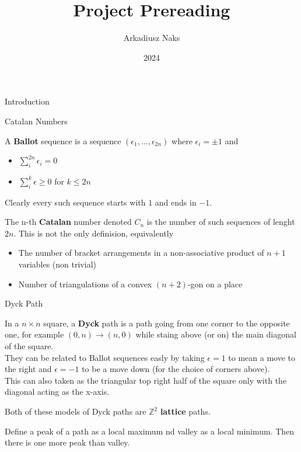 \documentclass[12pt, letterpaper]{article}
\title{Project Prereading}
\author{Arkadiusz Naks}
\date{2024}
\newcommand{\Z}{\mathbb{Z}}
\begin{document}
\tableofcontents
\newpage

\begin{section}{Introduction}

  \begin{subsection}{Catalan Numbers}

    A \textbf{Ballot} sequence is a sequence \((\epsilon_{1}, \dots,
    \epsilon_{2n})\) where \(\epsilon_{i} = \pm 1\) and
    \begin{itemize}
      \item \(\sum^{2n}_{i} \epsilon_{i} = 0\)
      \item \(\sum^{k}_{i} \epsilon \geq 0\) for \(k \leq 2n\)
    \end{itemize}
    Clearly every such sequence starts with \(1\) and ends in \(-1\).

    The n-th \textbf{Catalan} number denoted \(C_{n}\) is the number of such
    sequences of lenght \(2n\). This is not the only definision, equivalently
    \begin{itemize}
      \item The number of bracket arrangements in a non-associative product of
            \(n + 1\) variables (non trivial)
      \item Number of triangulations of a convex \((n + 2)\)-gon on a place
    \end{itemize}

    \begin{subsubsection}{Dyck Path}

      In a \(n \times n\) square, a \textbf{Dyck} path is a path going from one
      corner to the opposite one, for example \((0, n) \to (n, 0)\) while staing
      above (or on) the main diagonal of the square. \\
      They can be related to Ballot sequences easly by taking \(\epsilon = 1\)
      to mean a move to the right and \(\epsilon = -1\) to be a move down (for
      the choice of corners above). \\
      This can also taken as the triangular top right half of the square only
      with the diagonal acting as the x-axis.

      Both of these models of Dyck paths are \(\Z^{2}\) \textbf{lattice} paths.

      Define a peak of a path as a local maximum nd valley as a local minimum.
      Then there is one more peak than valley.

    \end{subsubsection}


\end{subsection}
\end{section}
\end{document}
